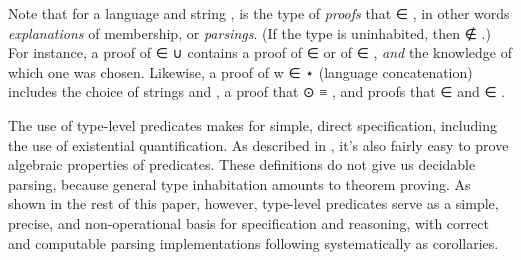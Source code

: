 \documentclass[acmsmall,screen,anonymous,timestamp]{acmart}
\begin{document}
Note that for a language  and string , { } is the type of \emph{proofs} that { ∈ }, in other words \emph{explanations} of membership, or \emph{parsings}.
(If the type { } is uninhabited, then { ∉ }.)
For instance, a proof of { ∈  \AF ∪ } contains a proof of { ∈ } or of { \AF ∈ }, \emph{and} the knowledge of which one was chosen.
Likewise, a proof of {w ∈  \AF ⋆ } (language concatenation) includes the choice of strings  and , a proof that { \AF ⊙  \AD ≡ }, and proofs that { ∈ } and { ∈ }.

The use of type-level predicates makes for simple, direct specification, including the use of existential quantification.
As described in , it's also fairly easy to prove algebraic properties of predicates.
These definitions do not give us decidable parsing, because general type inhabitation amounts to theorem proving.
As shown in the rest of this paper, however, type-level predicates serve as a simple, precise, and non-operational basis for specification and reasoning, with correct and computable parsing implementations following systematically as corollaries.
\end{document}
